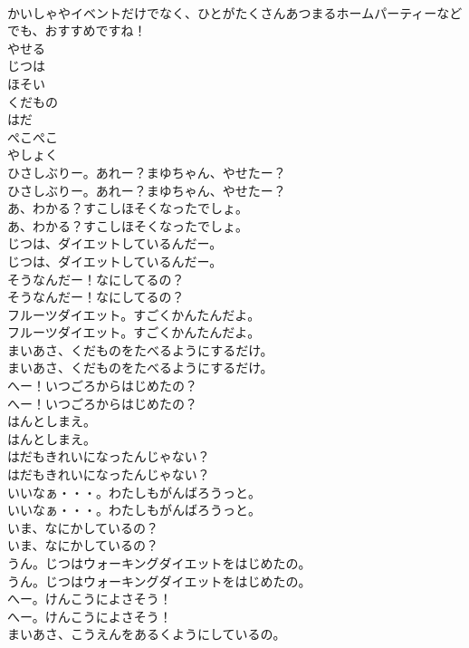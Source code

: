 \documentclass[8pt]{extreport}
\begin{document}
\begin{CJK}{UTF8}{min}
\\	かいしゃやイベントだけでなく、ひとがたくさんあつまるホームパーティーなどでも、おすすめですね！
\\	やせる
\\	じつは
\\	ほそい
\\	くだもの
\\	はだ
\\	ぺこぺこ
\\	やしょく
\\	ひさしぶりー。あれー？まゆちゃん、やせたー？
\\	ひさしぶりー。あれー？まゆちゃん、やせたー？
\\	あ、わかる？すこしほそくなったでしょ。
\\	あ、わかる？すこしほそくなったでしょ。
\\	じつは、ダイエットしているんだー。
\\	じつは、ダイエットしているんだー。
\\	そうなんだー！なにしてるの？
\\	そうなんだー！なにしてるの？
\\	フルーツダイエット。すごくかんたんだよ。
\\	フルーツダイエット。すごくかんたんだよ。
\\	まいあさ、くだものをたべるようにするだけ。
\\	まいあさ、くだものをたべるようにするだけ。
\\	へー！いつごろからはじめたの？
\\	へー！いつごろからはじめたの？
\\	はんとしまえ。
\\	はんとしまえ。
\\	はだもきれいになったんじゃない？
\\	はだもきれいになったんじゃない？
\\	いいなぁ・・・。わたしもがんばろうっと。
\\	いいなぁ・・・。わたしもがんばろうっと。
\\	いま、なにかしているの？
\\	いま、なにかしているの？
\\	うん。じつはウォーキングダイエットをはじめたの。
\\	うん。じつはウォーキングダイエットをはじめたの。
\\	へー。けんこうによさそう！
\\	へー。けんこうによさそう！
\\	まいあさ、こうえんをあるくようにしているの。

\end{CJK}
\end{document}
